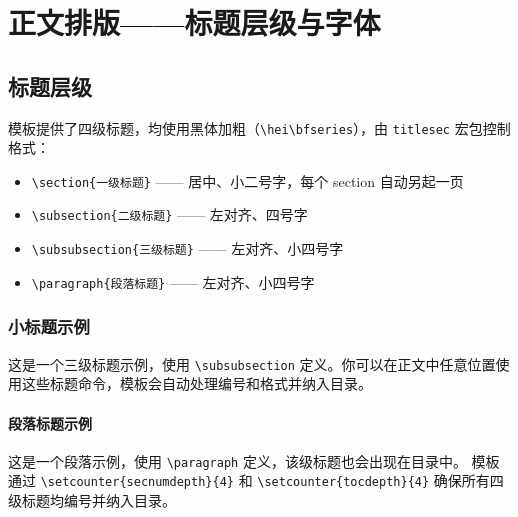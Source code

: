 \documentclass{sysu_report}
\begin{document}
\section{正文排版——标题层级与字体}
\subsection{标题层级}
模板提供了四级标题，均使用黑体加粗（\verb|\hei\bfseries|），由 \texttt{titlesec} 宏包控制格式：
\begin{itemize}
    \item \verb|\section{一级标题}| —— 居中、小二号字，每个 section 自动另起一页
    \item \verb|\subsection{二级标题}| —— 左对齐、四号字
    \item \verb|\subsubsection{三级标题}| —— 左对齐、小四号字
    \item \verb|\paragraph{段落标题}| —— 左对齐、小四号字
\end{itemize}
\subsubsection{小标题示例}
这是一个三级标题示例，使用 \verb|\subsubsection| 定义。你可以在正文中任意位置使用这些标题命令，模板会自动处理编号和格式并纳入目录。
\paragraph{段落标题示例}
这是一个段落示例，使用 \verb|\paragraph| 定义，该级标题也会出现在目录中。
模板通过 \verb|\setcounter{secnumdepth}{4}| 和 \verb|\setcounter{tocdepth}{4}| 确保所有四级标题均编号并纳入目录。
\end{document}
